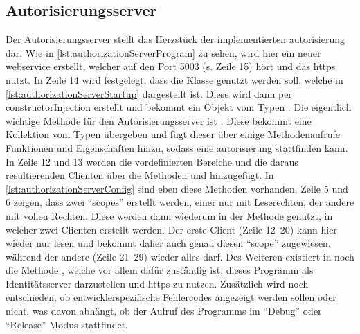 \subsection{Autorisierungsserver}\label{subsec:autorisierungsserver}

	Der Autorisierungsserver stellt das Herzstück der
	implementierten  \gls{autorisierung} dar.
	Wie in \vref{lst:authorizationServerProgram} zu sehen,
	wird hier ein neuer \gls{webservice} erstellt,
	welcher auf den Port 5003 (s. Zeile 15) hört und das \gls{https} nutzt.
	In Zeile 14 wird festgelegt,
	dass die Klasse  genutzt werden soll,
	welche in \vref{lst:authorizationServerStartup} dargestellt ist.
	Diese wird dann per \gls{constructorInjection} erstellt
	und bekommt ein Objekt vom Typen .
	Die eigentlich wichtige Methode für den Autorisierungsserver ist .
	Diese bekommt eine Kollektion vom Typen  übergeben
	und fügt dieser über einige Methodenaufrufe Funktionen und Eigenschaften hinzu,
	sodass eine \gls{autorisierung} stattfinden kann.
	In Zeile 12 und 13 werden die vordefinierten Bereiche
	und die daraus resultierenden Clienten
	über die Methoden 
	und  hinzugefügt.
	In \vref{lst:authorizationServerConfig} sind eben diese Methoden vorhanden.
	Zeile 5 und 6 zeigen, dass zwei \enquote{scopes} erstellt werden,
	einer nur mit Leserechten, der andere mit vollen Rechten.
	Diese werden dann wiederum in der Methode  genutzt,
	in welcher zwei Clienten erstellt werden.
	Der erste Client (Zeile 12--20) kann hier wieder nur lesen
	und bekommt daher auch genau diesen \enquote{scope} zugewiesen,
	während der andere (Zeile 21--29) wieder alles darf.
	Des Weiteren existiert in  noch die Methode ,
	welche vor allem dafür zuständig ist,
	dieses Programm als Identitätsserver darzustellen
	und \gls{https} zu nutzen.
	Zusätzlich wird noch entschieden,
	ob entwicklerspezifische Fehlercodes angezeigt werden sollen oder nicht,
	was davon abhängt,
	ob der Aufruf des Programms im \enquote{Debug}
	oder \enquote{Release} Modus stattfindet.